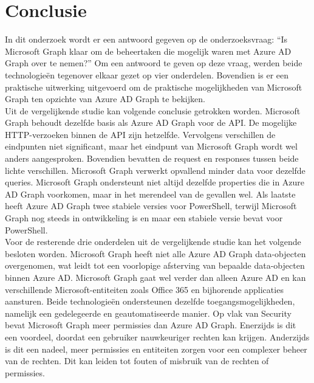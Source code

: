 
\chapter{Conclusie}%
\label{ch:conclusie}


In dit onderzoek wordt er een antwoord gegeven op de onderzoeksvraag: “Is Microsoft Graph klaar om de beheertaken die mogelijk waren met Azure AD Graph over te nemen?” Om een antwoord te geven op deze vraag, werden beide technologieën tegenover elkaar gezet op vier onderdelen. Bovendien is er een praktische uitwerking uitgevoerd om de praktische mogelijkheden van Microsoft Graph ten opzichte van Azure \Ac{AD} Graph te bekijken. \\

Uit de vergelijkende studie kan volgende conclusie getrokken worden. Microsoft Graph behoudt dezelfde basis als Azure \Ac{AD} Graph voor de \Ac{API}. De mogelijke \Ac{HTTP}-verzoeken binnen de \Ac{API} zijn hetzelfde. Vervolgens verschillen de eindpunten niet significant, maar het eindpunt van Microsoft Graph wordt wel anders aangesproken. Bovendien bevatten de request en responses tussen beide lichte verschillen. Microsoft Graph verwerkt opvallend minder data voor dezelfde queries. Microsoft Graph ondersteunt niet altijd dezelfde properties die in Azure \Ac{AD} Graph voorkomen, maar in het merendeel van de gevallen wel. Als laatste heeft Azure \Ac{AD} Graph twee stabiele versies voor PowerShell, terwijl Microsoft Graph nog steeds in ontwikkeling is en maar een stabiele versie bevat voor PowerShell. \\

Voor de resterende drie onderdelen uit de vergelijkende studie kan het volgende besloten worden. Microsoft Graph heeft niet alle Azure \Ac{AD} Graph data-objecten overgenomen, wat leidt tot een voorlopige afsterving van bepaalde data-objecten binnen Azure \Ac{AD}. Microsoft Graph gaat wel verder dan alleen Azure \Ac{AD} en kan verschillende Microsoft-entiteiten zoals Office 365 en bijhorende applicaties aansturen. Beide technologieën ondersteunen dezelfde toegangsmogelijkheden, namelijk een gedelegeerde en geautomatiseerde manier. Op vlak van Security bevat Microsoft Graph meer permissies dan Azure \Ac{AD} Graph. Enerzijds is dit een voordeel, doordat een gebruiker nauwkeuriger rechten kan krijgen. Anderzijds is dit een nadeel, meer permissies en entiteiten zorgen voor een complexer beheer van de rechten. Dit kan leiden tot fouten of misbruik van de rechten of permissies. \\ 


